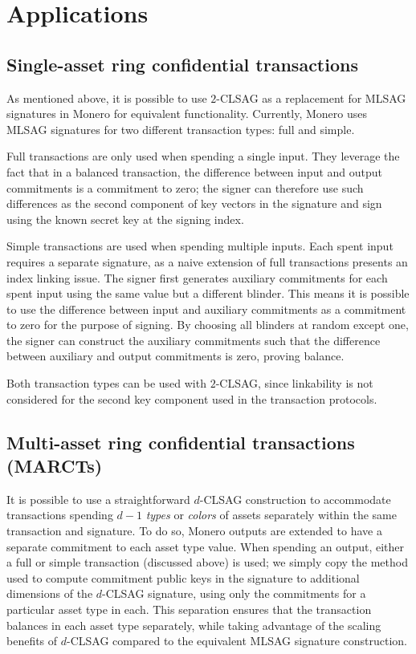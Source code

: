 \documentclass{article}
\theoremstyle{plain}
\theoremstyle{definition}
\begin{document}
\section{Applications}

\subsection{Single-asset ring confidential transactions}\label{sec:ringct}

As mentioned above, it is possible to use $2$-CLSAG as a replacement for MLSAG signatures in Monero for equivalent functionality. Currently, Monero uses MLSAG signatures for two different transaction types: full and simple.

Full transactions are only used when spending a single input. They leverage the fact that in a balanced transaction, the difference between input and output commitments is a commitment to zero; the signer can therefore use such differences as the second component of key vectors in the signature and sign using the known secret key at the signing index.

Simple transactions are used when spending multiple inputs. Each spent input requires a separate signature, as a naive extension of full transactions presents an index linking issue. The signer first generates auxiliary commitments for each spent input using the same value but a different blinder. This means it is possible to use the difference between input and auxiliary commitments as a commitment to zero for the purpose of signing. By choosing all blinders at random except one, the signer can construct the auxiliary commitments such that the difference between auxiliary and output commitments is zero, proving balance.

Both transaction types can be used with $2$-CLSAG, since linkability is not considered for the second key component used in the transaction protocols.


\subsection{Multi-asset ring confidential transactions (MARCTs)}

It is possible to use a straightforward $d$-CLSAG construction to accommodate transactions spending $d-1$ \textit{types} or \textit{colors} of assets separately within the same transaction and signature. To do so, Monero outputs are extended to have a separate commitment to each asset type value. When spending an output, either a full or simple transaction (discussed above) is used; we simply copy the method used to compute commitment public keys in the signature to additional dimensions of the $d$-CLSAG signature, using only the commitments for a particular asset type in each. This separation ensures that the transaction balances in each asset type separately, while taking advantage of the scaling benefits of $d$-CLSAG compared to the equivalent MLSAG signature construction.
\end{document}
